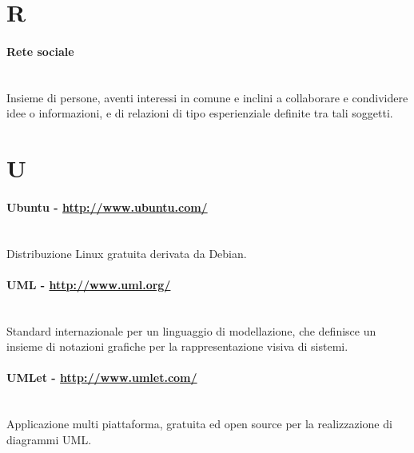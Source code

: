\section*{R}
\paragraph{Rete sociale} \hfill \\
Insieme di persone, aventi interessi in comune e inclini a collaborare e condividere idee o informazioni, e di relazioni di tipo esperienziale definite tra tali soggetti.

\section*{U}
\paragraph{Ubuntu - \url{http://www.ubuntu.com/}} \hfill \\
Distribuzione Linux gratuita derivata da Debian.
\paragraph{UML - \url{http://www.uml.org/}} \hfill \\
Standard internazionale per un linguaggio di modellazione, che definisce un insieme di notazioni grafiche per la rappresentazione visiva di sistemi.
\paragraph{UMLet - \url{http://www.umlet.com/}} \hfill \\
Applicazione multi piattaforma, gratuita ed open source per la realizzazione di diagrammi UML.
